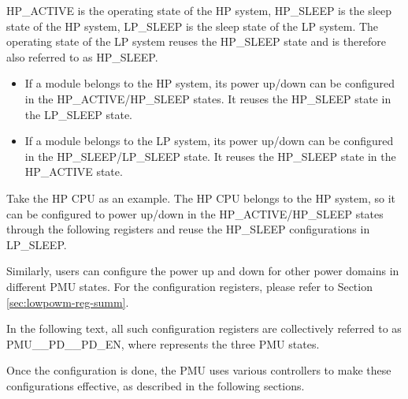 \documentclass[main\_\_EN.tex]{subfiles}
\begin{document}
HP\_ACTIVE is the operating state of the HP system, HP\_SLEEP is the sleep state of the HP system, LP\_SLEEP is the sleep state of the LP system. The operating state of the LP system reuses the HP\_SLEEP state and is therefore also referred to as HP\_SLEEP.

\begin{itemize}
    \item If a module belongs to the HP system, its power up/down can be configured in the HP\_ACTIVE/HP\_SLEEP states. It reuses the HP\_SLEEP state in the LP\_SLEEP state.
    \item If a module belongs to the LP system, its power up/down can be configured in the HP\_SLEEP/LP\_SLEEP state. It reuses the HP\_SLEEP state in the HP\_ACTIVE state.
\end{itemize}

Take the HP CPU as an example. The HP CPU belongs to the HP system, so it can be configured to power up/down in the HP\_ACTIVE/HP\_SLEEP states through the following registers and reuse the HP\_SLEEP configurations in LP\_SLEEP.

\begin{itemize}
\end{itemize}

Similarly, users can configure the power up and down for other power domains in different PMU states. For the configuration registers, please refer to Section \ref{sec:lowpowm-reg-summ}.

\begin{tiplisting}
In the following text, all such configuration registers are collectively referred to as PMU\_\_PD\_\_PD\_EN, where  represents the three PMU states.
\end{tiplisting}

Once the configuration is done, the PMU uses various controllers to make these configurations effective, as described in the following sections.
\end{document}

